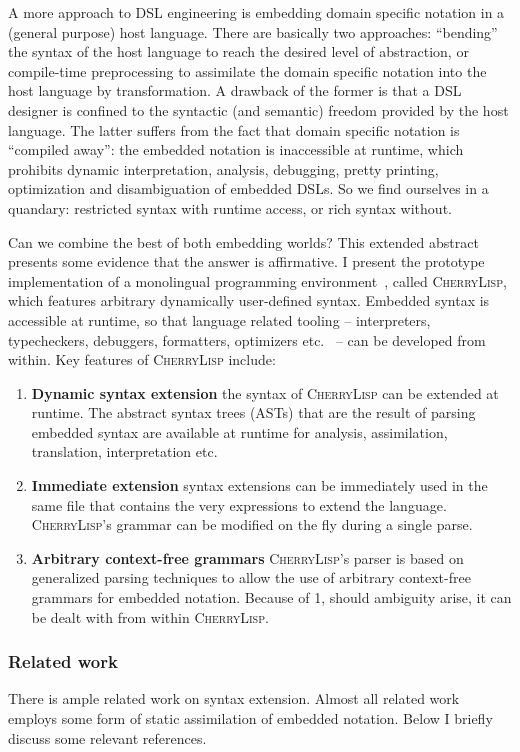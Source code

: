 \documentclass[a4paper]{llncs}
\def\cherrylisp{\textsc{CherryLisp}\xspace}
\begin{document}
A more approach to DSL engineering is embedding domain specific
notation in a (general purpose) host language. There are basically two
approaches: ``bending'' the syntax of the host language to reach the
desired level of abstraction, or compile-time preprocessing to
assimilate the domain specific notation into the host language by
transformation.  A drawback of the former is that a DSL designer is
confined to the syntactic (and semantic) freedom provided by the host
language. The latter suffers from the fact that domain specific
notation is ``compiled away'': the embedded notation is inaccessible
at runtime, which prohibits dynamic interpretation, analysis,
debugging, pretty printing, optimization and disambiguation of
embedded DSLs. So we find ourselves in a quandary: restricted syntax
with runtime access, or rich syntax without.

Can we combine the best of both embedding worlds? This extended
abstract presents some evidence that the answer is affirmative. I
present the prototype implementation of a monolingual programming
environment~\cite{Monolingual,Eentalig}, called \cherrylisp, which
features arbitrary dynamically user-defined syntax. Embedded syntax is
accessible at runtime, so that language related tooling --
interpreters, typecheckers, debuggers, formatters, optimizers
etc.~\cite{ToolOriented} -- can be developed from within. Key features
of \cherrylisp include:
\begin{enumerate}
\item \textbf{Dynamic syntax extension} the syntax of \cherrylisp can
  be extended at runtime. The abstract syntax trees (ASTs) that are
  the result of parsing embedded syntax are available at runtime for
  analysis, assimilation, translation, interpretation etc.
\item \textbf{Immediate extension} syntax extensions can be immediately used
  in the same file that contains the very expressions to extend the
  language. \cherrylisp's grammar can be modified on the fly during a
  single parse.
\item \textbf{Arbitrary context-free grammars} \cherrylisp's parser is
  based on generalized parsing techniques to allow the use of
  arbitrary context-free grammars for embedded notation. Because of 1,
  should ambiguity arise, it can be dealt with from within \cherrylisp.
\end{enumerate}


\subsubsection*{Related work}
There is ample related work on syntax extension. Almost all related
work employs some form of static assimilation of embedded
notation. Below I briefly discuss some relevant references.
\end{document}
